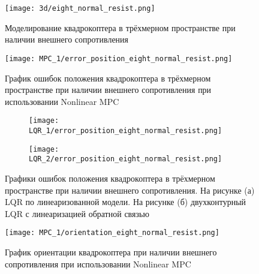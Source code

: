 \newpage 

\begin{figure}[ht]
    \centering
    \texttt{[image: 3d/eight\_normal\_resist.png]}
    \caption{Моделирование квадрокоптера в трёхмерном пространстве при наличии внешнего сопротивления}
    \label{}
\end{figure}


\begin{figure}[ht]
    \centering
    \texttt{[image: MPC\_1/error\_position\_eight\_normal\_resist.png]}
    \caption{График ошибок положения квадрокоптера в трёхмерном пространстве при наличии внешнего сопротивления при использовании Nonlinear MPC}
    \label{}
\end{figure}

\begin{figure}[ht]
	\centering
\hspace*{\fill}%
	\begin{subfigure}[b]{0.49\textwidth}
        \centering
		\texttt{[image: LQR\_1/error\_position\_eight\_normal\_resist.png]}
		\caption{}
		\label{fig:tiger1}
	\end{subfigure}
\hfill
	\begin{subfigure}[b]{0.49\textwidth}
        \centering
		\texttt{[image: LQR\_2/error\_position\_eight\_normal\_resist.png]}
        \caption{}
		\label{fig:tiger2}
	\end{subfigure}
\hspace*{\fill}%
	\caption{Графики ошибок положения квадрокоптера в трёхмерном пространстве при наличии внешнего сопротивления. На рисунке (а) LQR по линеаризованной модели. На рисунке (б) двухконтурный LQR с линеаризацией обратной связью}
	\label{fig:tiger}
\end{figure}

\newpage

\begin{figure}[ht]
    \centering
    \texttt{[image: MPC\_1/orientation\_eight\_normal\_resist.png]}
    \caption{График ориентации квадрокоптера при наличии внешнего сопротивления при использовании Nonlinear MPC}
    \label{}
\end{figure}

